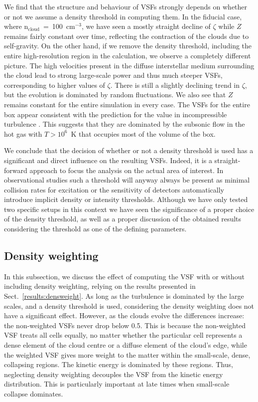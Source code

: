 \documentclass{aa}		%
\begin{document}
We find that the structure and behaviour of VSFs strongly depends on whether or not we assume a density threshold in computing them.
In the fiducial case, where n$_\mathrm{cloud}$~=~100~cm$^{-3}$, we have seen a mostly straight decline of $\zeta$ while $Z$ remains fairly constant over time, reflecting the contraction of the clouds due to self-gravity.
On the other hand, if we remove the density threshold, including the entire high-resolution region in the calculation, we observe a completely different picture.
The high velocities present in the diffuse interstellar medium surrounding the cloud lead to strong large-scale power and thus much steeper VSFs, corresponding to higher values of $\zeta$. 
There is still a slightly declining trend in $\zeta$, but the evolution is dominated by random fluctuations.
We also see that $Z$ remains constant for the entire simulation in every case.
The VSFs for the entire box appear consistent with the prediction for the value in incompressible turbulence \citep{Boldyrev2002}. This suggests that they are dominated by the subsonic flow in the hot gas with $T > 10^6$~K that occupies most of the volume of the box.

We conclude that the decision of whether or not a density threshold is used has a significant and direct influence on the resulting VSFs.
Indeed, it is a straight-forward approach to focus the analysis on the actual area of interest.
In observational studies such a threshold will anyway always be present as minimal collision rates for excitation or the sensitivity of detectors automatically introduce implicit density or intensity thresholds. 
Although we have only tested two specific setups in this context we have seen the significance of a proper choice of the density threshold, as well as a proper discussion of the obtained results considering the threshold as one of the defining parameters.




\subsection{Density weighting}\label{discussion:densweight}


In this subsection, we discuss the effect of computing the VSF with or without including density weighting, relying on the results presented in Sect.~\ref{results:densweight}.
As long as the turbulence is dominated by the large scales, and a density threshold is used, considering the density weighting does not have a significant effect.
However, as the clouds evolve the differences increase:
the non-weighted VSFs never drop below 0.5.
This is because the non-weighted VSF treats all cells equally, no matter whether the particular cell represents a dense element of the cloud centre or a diffuse element of the cloud's edge, while the weighted VSF gives more weight to the matter within the small-scale, dense, collapsing regions.
The kinetic energy is dominated by these regions.
Thus, neglecting density weighting decouples the VSF from the kinetic energy distribution. 
This is particularly important at late times when small-scale collapse dominates.
\end{document}

